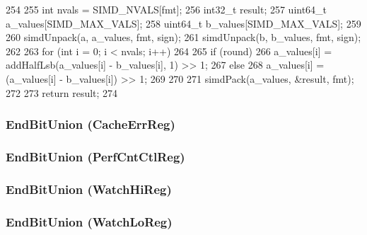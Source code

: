 \begin{DoxyCode}
254 {
255     int nvals = SIMD_NVALS[fmt];
256     int32_t result;
257     uint64_t a_values[SIMD_MAX_VALS];
258     uint64_t b_values[SIMD_MAX_VALS];
259 
260     simdUnpack(a, a_values, fmt, sign);
261     simdUnpack(b, b_values, fmt, sign);
262 
263     for (int i = 0; i < nvals; i++)
264     {
265         if (round)
266             a_values[i] = addHalfLsb(a_values[i] - b_values[i], 1) >> 1;
267         else
268             a_values[i] = (a_values[i] - b_values[i]) >> 1;
269     }
270 
271     simdPack(a_values, &result, fmt);
272 
273     return result;
274 }
\end{DoxyCode}
\hypertarget{namespaceMipsISA_a78f47097e3bcf7a332c355f3e830c0f0}{
\subsubsection[{EndBitUnion}]{\setlength{\rightskip}{0pt plus 5cm}EndBitUnion (CacheErrReg)}}
\label{namespaceMipsISA_a78f47097e3bcf7a332c355f3e830c0f0}
\hypertarget{namespaceMipsISA_aad6da03f58562dcac647243534841a82}{
\subsubsection[{EndBitUnion}]{\setlength{\rightskip}{0pt plus 5cm}EndBitUnion (PerfCntCtlReg)}}
\label{namespaceMipsISA_aad6da03f58562dcac647243534841a82}
\hypertarget{namespaceMipsISA_ae140b2b16da5e91f8048be7ae8764a4a}{
\subsubsection[{EndBitUnion}]{\setlength{\rightskip}{0pt plus 5cm}EndBitUnion (WatchHiReg)}}
\label{namespaceMipsISA_ae140b2b16da5e91f8048be7ae8764a4a}
\hypertarget{namespaceMipsISA_a1b5b420a450d8d1d2436f7c8558e65c2}{
\subsubsection[{EndBitUnion}]{\setlength{\rightskip}{0pt plus 5cm}EndBitUnion (WatchLoReg)}}
\label{namespaceMipsISA_a1b5b420a450d8d1d2436f7c8558e65c2}

